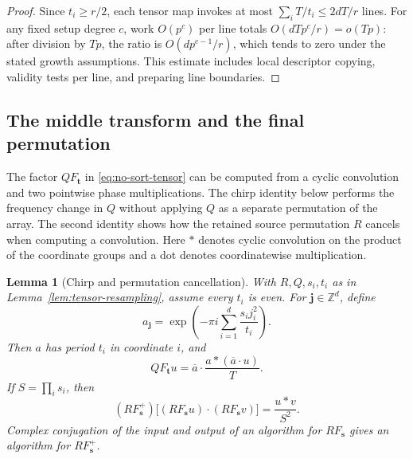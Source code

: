 \documentclass[11pt]{article}
\newtheorem{lemma}[theorem]{Lemma}
\theoremstyle{definition}
\begin{document}
\begin{proof}
Since $t_i\geq r/2$, each tensor map invokes at most
$\sum_iT/t_i\leq2dT/r$ lines. For any fixed setup degree $c$, work
$O(p^c)$ per line totals $O(dTp^c/r)=o(Tp)$: after division by $Tp$,
the ratio is $O(dp^{c-1}/r)$, which tends to zero under the stated growth
assumptions. This estimate includes local descriptor copying, validity
tests per line, and preparing line boundaries.
\end{proof}

\subsection{The middle transform and the final permutation}

The factor $QF_{\boldsymbol t}$ in \eqref{eq:no-sort-tensor} can be
computed from a cyclic convolution and two pointwise phase
multiplications. The chirp identity below performs the frequency change
in $Q$ without applying $Q$ as a separate permutation of the array.
The second identity shows how the
retained source permutation $R$ cancels when computing a convolution.
Here $*$ denotes
cyclic convolution on the product of the coordinate groups and a dot
denotes coordinatewise multiplication.

\begin{lemma}[Chirp and permutation cancellation]
\label{lem:chirp-permutation}
With $R,Q,s_i,t_i$ as in Lemma~\ref{lem:tensor-resampling},
assume every $t_i$ is even. For $\boldsymbol j\in\mathbb Z^d$, define
\[
 a_{\boldsymbol j}
 =\exp\left(-\pi i\sum_{i=1}^d\frac{s_i j_i^2}{t_i}\right).
\]
Then $a$ has period $t_i$ in coordinate $i$, and
\begin{equation}
 QF_{\boldsymbol t}u
 =\overline a\mathbin{\cdot}
       \frac{a*(\overline a\mathbin{\cdot}u)}{T}.
 \label{eq:permuted-chirp}
\end{equation}
If $S=\prod_i s_i$, then
\begin{equation}
 (RF_{\boldsymbol s}^+)
   \bigl[(RF_{\boldsymbol s}u)\mathbin{\cdot}
         (RF_{\boldsymbol s}v)\bigr]
 =\frac{u*v}{S^2}.
 \label{eq:source-permutation-cancel}
\end{equation}
Complex conjugation of the input and output of an algorithm for
$RF_{\boldsymbol s}$ gives an algorithm for $RF_{\boldsymbol s}^+$.
\end{lemma}
\end{document}

